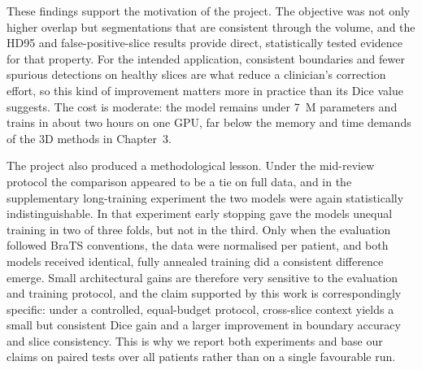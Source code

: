These findings support the motivation of the project. The objective was not only higher overlap but segmentations that are consistent through the volume, and the HD95 and false-positive-slice results provide direct, statistically tested evidence for that property. For the intended application, consistent boundaries and fewer spurious detections on healthy slices are what reduce a clinician's correction effort, so this kind of improvement matters more in practice than its Dice value suggests. The cost is moderate: the model remains under 7~M parameters and trains in about two hours on one GPU, far below the memory and time demands of the 3D methods in Chapter~3.

The project also produced a methodological lesson. Under the mid-review protocol the comparison appeared to be a tie on full data, and in the supplementary long-training experiment the two models were again statistically indistinguishable. In that experiment early stopping gave the models unequal training in two of three folds, but not in the third. Only when the evaluation followed BraTS conventions, the data were normalised per patient, and both models received identical, fully annealed training did a consistent difference emerge. Small architectural gains are therefore very sensitive to the evaluation and training protocol, and the claim supported by this work is correspondingly specific: under a controlled, equal-budget protocol, cross-slice context yields a small but consistent Dice gain and a larger improvement in boundary accuracy and slice consistency. This is why we report both experiments and base our claims on paired tests over all patients rather than on a single favourable run.

